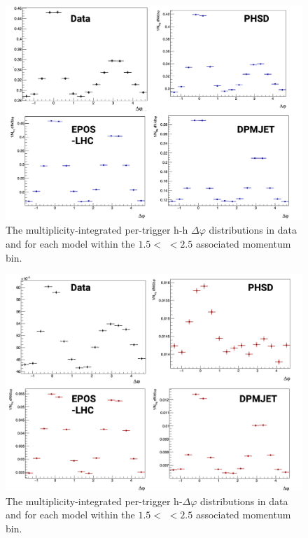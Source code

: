 \begin{figure}[ht]
\centering
\includegraphics[width=\textwidth]{figures/results/h_h_1d_modelcomp.png}
\caption{The multiplicity-integrated per-trigger h-h $\Delta\varphi$ distributions in data and for each model within the $1.5 <$ \pt $< 2.5$ \GeVc associated momentum bin.}
\label{fig:h_h_1d_model}
\end{figure}

\begin{figure}[ht]
\centering
\includegraphics[width=\textwidth]{figures/results/h_lambda_1d_modelcomp.png}
\caption{The multiplicity-integrated per-trigger h-\lmb $\Delta\varphi$ distributions in data and for each model within the $1.5 <$ \pt $< 2.5$ \GeVc associated momentum bin.}
\label{fig:h_lambda_1d_model}
\end{figure}

